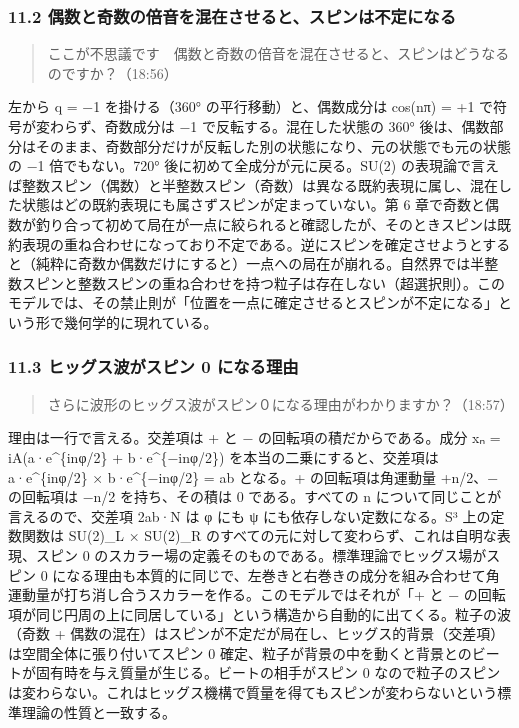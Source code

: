 \documentclass[
  a4paper,
]{ltjsarticle}
\begin{document}
\subsubsection{11.2
偶数と奇数の倍音を混在させると、スピンは不定になる}\label{ux5076ux6570ux3068ux5947ux6570ux306eux500dux97f3ux3092ux6df7ux5728ux3055ux305bux308bux3068ux30b9ux30d4ux30f3ux306fux4e0dux5b9aux306bux306aux308b}

\begin{quote}
ここが不思議です　偶数と奇数の倍音を混在させると、スピンはどうなるのですか？（18:56）
\end{quote}

左から q = −1 を掛ける（360° の平行移動）と、偶数成分は cos(nπ) = +1
で符号が変わらず、奇数成分は −1 で反転する。混在した状態の 360°
後は、偶数部分はそのまま、奇数部分だけが反転した別の状態になり、元の状態でも元の状態の
−1 倍でもない。720° 後に初めて全成分が元に戻る。SU(2)
の表現論で言えば整数スピン（偶数）と半整数スピン（奇数）は異なる既約表現に属し、混在した状態はどの既約表現にも属さずスピンが定まっていない。第
6
章で奇数と偶数が釣り合って初めて局在が一点に絞られると確認したが、そのときスピンは既約表現の重ね合わせになっており不定である。逆にスピンを確定させようとすると（純粋に奇数か偶数だけにすると）一点への局在が崩れる。自然界では半整数スピンと整数スピンの重ね合わせを持つ粒子は存在しない（超選択則）。このモデルでは、その禁止則が「位置を一点に確定させるとスピンが不定になる」という形で幾何学的に現れている。

\subsubsection{11.3 ヒッグス波がスピン 0
になる理由}\label{ux30d2ux30c3ux30b0ux30b9ux6ce2ux304cux30b9ux30d4ux30f3-0-ux306bux306aux308bux7406ux7531}

\begin{quote}
さらに波形のヒッグス波がスピン０になる理由がわかりますか？（18:57）
\end{quote}

理由は一行で言える。交差項は + と − の回転項の積だからである。成分 xₙ =
iA(a·e\^{}\{inφ/2\} + b·e\^{}\{−inφ/2\}) を本当の二乗にすると、交差項は
a·e\^{}\{inφ/2\} × b·e\^{}\{−inφ/2\} = ab となる。+ の回転項は角運動量
+n/2、− の回転項は −n/2 を持ち、その積は 0 である。すべての n
について同じことが言えるので、交差項 2ab·N は φ にも ψ
にも依存しない定数になる。S³ 上の定数関数は SU(2)\_L × SU(2)\_R
のすべての元に対して変わらず、これは自明な表現、スピン 0
のスカラー場の定義そのものである。標準理論でヒッグス場がスピン 0
になる理由も本質的に同じで、左巻きと右巻きの成分を組み合わせて角運動量が打ち消し合うスカラーを作る。このモデルではそれが「+
と −
の回転項が同じ円周の上に同居している」という構造から自動的に出てくる。粒子の波（奇数
+
偶数の混在）はスピンが不定だが局在し、ヒッグス的背景（交差項）は空間全体に張り付いてスピン
0
確定、粒子が背景の中を動くと背景とのビートが固有時を与え質量が生じる。ビートの相手がスピン
0
なので粒子のスピンは変わらない。これはヒッグス機構で質量を得てもスピンが変わらないという標準理論の性質と一致する。
\end{document}
